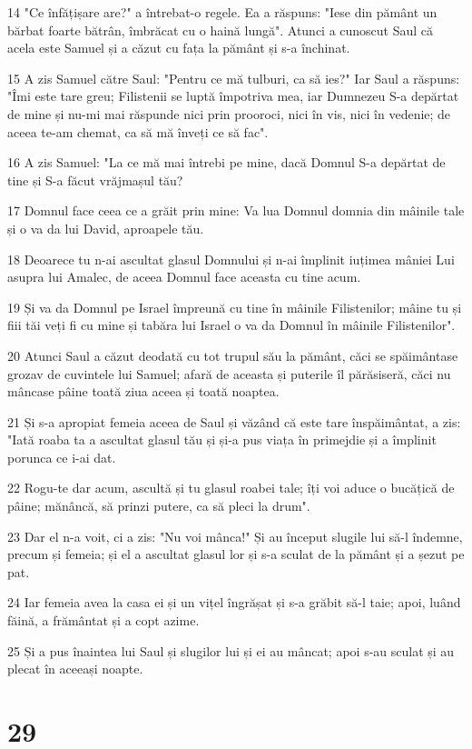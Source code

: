 \par 14 "Ce înfățișare are?" a întrebat-o regele. Ea a răspuns: "Iese din pământ un bărbat foarte bătrân, îmbrăcat cu o haină lungă". Atunci a cunoscut Saul că acela este Samuel și a căzut cu fața la pământ și s-a închinat.
\par 15 A zis Samuel către Saul: "Pentru ce mă tulburi, ca să ies?" Iar Saul a răspuns: "Îmi este tare greu; Filistenii se luptă împotriva mea, iar Dumnezeu S-a depărtat de mine și nu-mi mai răspunde nici prin prooroci, nici în vis, nici în vedenie; de aceea te-am chemat, ca să mă înveți ce să fac".
\par 16 A zis Samuel: "La ce mă mai întrebi pe mine, dacă Domnul S-a depărtat de tine și S-a făcut vrăjmașul tău?
\par 17 Domnul face ceea ce a grăit prin mine: Va lua Domnul domnia din mâinile tale și o va da lui David, aproapele tău.
\par 18 Deoarece tu n-ai ascultat glasul Domnului și n-ai împlinit iuțimea mâniei Lui asupra lui Amalec, de aceea Domnul face aceasta cu tine acum.
\par 19 Și va da Domnul pe Israel împreună cu tine în mâinile Filistenilor; mâine tu și fiii tăi veți fi cu mine și tabăra lui Israel o va da Domnul în mâinile Filistenilor".
\par 20 Atunci Saul a căzut deodată cu tot trupul său la pământ, căci se spăimântase grozav de cuvintele lui Samuel; afară de aceasta și puterile îl părăsiseră, căci nu mâncase pâine toată ziua aceea și toată noaptea.
\par 21 Și s-a apropiat femeia aceea de Saul și văzând că este tare înspăimântat, a zis: "Iată roaba ta a ascultat glasul tău și și-a pus viața în primejdie și a împlinit porunca ce i-ai dat.
\par 22 Rogu-te dar acum, ascultă și tu glasul roabei tale; îți voi aduce o bucățică de pâine; mănâncă, să prinzi putere, ca să pleci la drum".
\par 23 Dar el n-a voit, ci a zis: "Nu voi mânca!" Și au început slugile lui să-l îndemne, precum și femeia; și el a ascultat glasul lor și s-a sculat de la pământ și a șezut pe pat.
\par 24 Iar femeia avea la casa ei și un vițel îngrășat și s-a grăbit să-l taie; apoi, luând făină, a frământat și a copt azime.
\par 25 Și a pus înaintea lui Saul și slugilor lui și ei au mâncat; apoi s-au sculat și au plecat în aceeași noapte.

\chapter{29}

